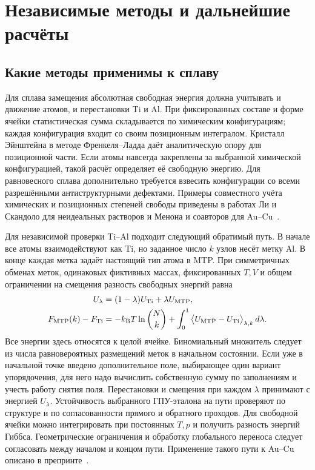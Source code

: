 \section{Независимые методы и дальнейшие расчёты}
\label{sec:outlook}

\subsection{Какие методы применимы к сплаву}

Для сплава замещения абсолютная свободная энергия должна учитывать и движение
атомов, и перестановки Ti и Al. При фиксированных составе и форме ячейки
статистическая сумма складывается по химическим конфигурациям; каждая
конфигурация входит со своим позиционным интегралом. Кристалл Эйнштейна в
методе Френкеля--Ладда даёт аналитическую опору для позиционной части.
Если атомы навсегда закреплены за выбранной химической конфигурацией, такой
расчёт определяет её свободную энергию. Для равновесного сплава дополнительно
требуется взвесить конфигурации со всеми разрешёнными антиструктурными
дефектами. Примеры совместного учёта химических и позиционных степеней
свободы приведены в работах Ли и Скандоло для неидеальных растворов и
Менона и соавторов для Au--Cu~\cite{frenkel1984,li2024,menon2026}.

Для независимой проверки Ti--Al подходит следующий обратимый путь.
В начале все атомы взаимодействуют как Ti, но заданное число \(k\) узлов
несёт метку Al. В конце каждая метка задаёт настоящий тип атома в MTP.
При симметричных обменах меток, одинаковых фиктивных массах, фиксированных
\(T,V\) и общем ограничении на смещения разность свободных энергий равна
\begin{align}
 U_\lambda &=(1-\lambda)U_{\rm Ti}+\lambda U_{\rm MTP}, \notag\\
 F_{\rm MTP}(k)-F_{\rm Ti}
   &=-k_{\rm B}T\ln {N\choose k}
      +\int_0^1 \big\langle U_{\rm MTP}-U_{\rm Ti}
                        \big\rangle_{\lambda,k}\,d\lambda .
 \label{eq:alloy-alchemical}
\end{align}
Все энергии здесь относятся к целой ячейке. Биномиальный множитель следует
из числа равновероятных размещений меток в начальном состоянии. Если уже в
начальной точке введено дополнительное поле, выбирающее один вариант
упорядочения, для него надо вычислить собственную сумму по заполнениям и
учесть работу снятия поля. Перестановки и смещения при каждом \(\lambda\)
принимают с энергией \(U_\lambda\). Устойчивость выбранного
ГПУ-эталона на пути проверяют по структуре и по согласованности прямого
и обратного проходов. Для свободной ячейки можно
интегрировать при постоянных \(T,p\) и получить разность энергий Гиббса.
Геометрические ограничения и обработку глобального переноса следует
согласовать между началом и концом пути. Применение такого пути к Au--Cu
описано в препринте~\cite{menon2026}.

